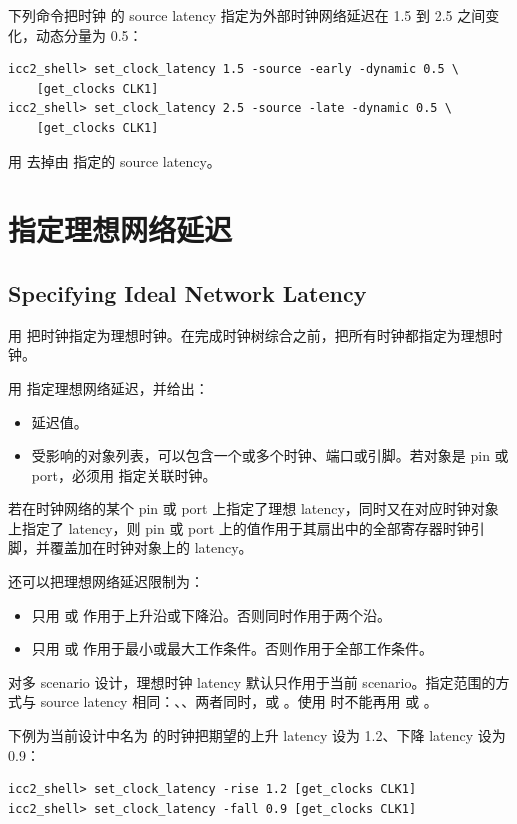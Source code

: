 下列命令把时钟  的 source latency 指定为外部时钟网络延迟在 1.5 到 2.5 之间变化，动态分量为 0.5：
\begin{lstlisting}
icc2_shell> set_clock_latency 1.5 -source -early -dynamic 0.5 \
    [get_clocks CLK1]
icc2_shell> set_clock_latency 2.5 -source -late -dynamic 0.5 \
    [get_clocks CLK1]
\end{lstlisting}

用  去掉由  指定的 source latency。

\section{指定理想网络延迟}
\subsection*{Specifying Ideal Network Latency}

用  把时钟指定为理想时钟。在完成时钟树综合之前，把所有时钟都指定为理想时钟。

用 \cmd{set\_clock\_latency} 指定理想网络延迟，并给出：
\begin{itemize}
  \item 延迟值。
  \item 受影响的对象列表，可以包含一个或多个时钟、端口或引脚。若对象是 pin 或 port，必须用  指定关联时钟。
\end{itemize}

若在时钟网络的某个 pin 或 port 上指定了理想 latency，同时又在对应时钟对象上指定了 latency，则 pin 或 port 上的值作用于其扇出中的全部寄存器时钟引脚，并覆盖加在时钟对象上的 latency。

还可以把理想网络延迟限制为：
\begin{itemize}
  \item 只用  或  作用于上升沿或下降沿。否则同时作用于两个沿。
  \item 只用  或  作用于最小或最大工作条件。否则作用于全部工作条件。
\end{itemize}

对多 scenario 设计，理想时钟 latency 默认只作用于当前 scenario。指定范围的方式与 source latency 相同：、、两者同时，或 。使用  时不能再用  或 。

下例为当前设计中名为 \cmd{CLK1} 的时钟把期望的上升 latency 设为 1.2、下降 latency 设为 0.9：
\begin{lstlisting}
icc2_shell> set_clock_latency -rise 1.2 [get_clocks CLK1]
icc2_shell> set_clock_latency -fall 0.9 [get_clocks CLK1]
\end{lstlisting}

